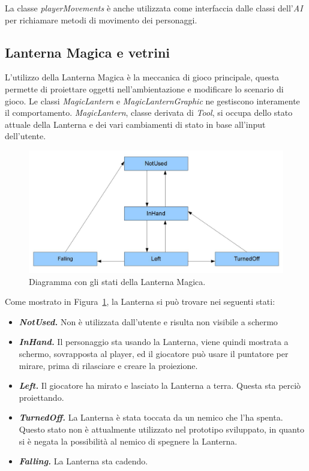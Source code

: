 La classe \textit{playerMovements} è anche utilizzata come interfaccia dalle classi dell’\textit{AI} per richiamare metodi di movimento dei personaggi.

\subsection{Lanterna Magica e vetrini}

L’utilizzo della Lanterna Magica è la meccanica di gioco principale, questa permette di proiettare oggetti nell’ambientazione e modificare lo scenario di gioco.
Le classi \textit{MagicLantern} e \textit{MagicLanternGraphic} ne gestiscono interamente il comportamento.
\textit{MagicLantern}, classe derivata di \textit{Tool}, si occupa dello stato attuale della Lanterna e dei vari cambiamenti di stato in base all’input dell’utente.

\begin{figure}%
	\centering
	\includegraphics[width= 0.9\columnwidth]{images/development/lanterna.jpg}
	\caption{Diagramma con gli stati della Lanterna Magica.}
	\label{fig:development_lanterna_stati}
\end{figure}

Come mostrato in Figura~\ref{fig:development_lanterna_stati}, la Lanterna si può trovare nei seguenti stati:

\begin{itemize}
	\item \textit{\textbf{NotUsed.}} Non è utilizzata dall’utente e risulta non visibile a schermo
	\item \textit{\textbf{InHand.}} Il personaggio sta usando la Lanterna, viene quindi mostrata a schermo, sovrapposta al player, ed il giocatore può usare il puntatore per mirare, prima di rilasciare e creare la proiezione.
	\item \textit{\textbf{Left.}} Il giocatore ha mirato e lasciato la Lanterna a terra. Questa sta perciò proiettando.
	\item \textit{\textbf{TurnedOff.}} La Lanterna è stata toccata da un nemico che l’ha spenta. Questo stato non è attualmente utilizzato nel prototipo sviluppato, in quanto si è negata la possibilità al nemico di spegnere la Lanterna.
	\item \textit{\textbf{Falling.}} La Lanterna sta cadendo.
\end{itemize}

